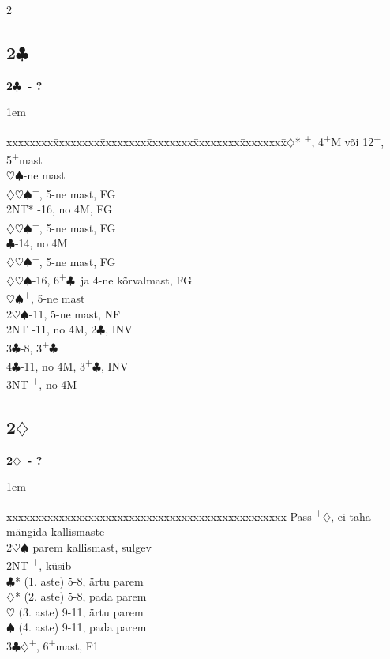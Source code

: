 \documentclass[10pt]{article}
\renewcommand{\c}{$\clubsuit$}
\renewcommand{\d}{$\diamondsuit$}
\newcommand{\h}{$\heartsuit$}
\newcommand{\s}{$\spadesuit$}
\newcommand{\p}{\textsuperscript{+}}
\newcommand{\m}{\textsuperscript{\textminus}}
\newenvironment{bidtable}[1][]
{\textbf{#1}
  \begin{adjustwidth}{1em}{}
    \addvspace{2pt}
    \begin{tabbing}
      xxxxxxxx\=xxxxxxxx\=xxxxxxxx\=xxxxxxxx\=xxxxxxxx\=xxxxxxxx\=\kill}
{\end{tabbing}\end{adjustwidth}\bigskip}%
\newcommand{\pdfc}{\texorpdfstring{\c{}}{C}}
\newcommand{\pdfd}{\texorpdfstring{\d{}}{D}}
\begin{document}
\begin{multicols*}{2}


\newpage
\subsection{2\pdfc}

\begin{bidtable}[2\c\ - ?]
2\d*  {}\p, 4\p M või 12\p, 5\p mast                   \\
      \h\s   {}-ne mast                            \\
      \>         \d\h\s {}\p, 5-ne mast, FG       \\
      \> 2NT*    -16, no 4M, FG                     \\
      \>         \d\h\s {}\p, 5-ne mast, FG       \\
      \c     {}-14, no 4M                         \\
      \>         \d\h\s {}\p, 5-ne mast, FG       \\
      \d\h\s {}-16, 6\p\c\ ja 4-ne kõrvalmast, FG \\
      \>         \h\s   {}\p, 5-ne mast           \\
2\h\s {}-11, 5-ne mast, NF                             \\
2NT   -11, no 4M, 2\m\c , INV                        \\
3\c   {}-8, 3\p\c                                      \\
4\c   {}-11, no 4M, 3\p\c , INV                        \\
3NT   \p, no 4M
\end{bidtable}

\subsection{2\pdfd}

\begin{bidtable}[2\d\ - ?]
Pass  \p\d , ei taha mängida kallismaste \\
2\h\s \> parem kallismast, sulgev            \\
2NT   \p , küsib                        \\
      \c* \> (1. aste) 5-8, ärtu parem   \\
      \d* \> (2. aste) 5-8, pada parem   \\
      \h  \> (3. aste) 9-11, ärtu parem  \\
      \s  \> (4. aste) 9-11, pada parem  \\
3\c\d {}\p , 6\p mast, F1
\end{bidtable}


\end{multicols*}
\end{document}
